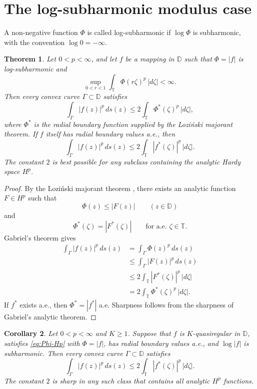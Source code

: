\documentclass[11pt]{article}
\newtheorem{theorem}{Theorem}[section]
\newtheorem{corollary}[theorem]{Corollary}
\theoremstyle{definition}
\theoremstyle{remark}
\newcommand{\D}{\mathbb D}
\newcommand{\T}{\mathbb T}
\newcommand{\ds}{\,ds}
\begin{document}
\section{The log-subharmonic modulus case}

A non-negative function $\Phi$ is called log-subharmonic if $\log\Phi$ is subharmonic, with the convention $\log0=-\infty$.

\begin{theorem}\label{thm:log-subharmonic}
Let $0<p<\infty$, and let $f$ be a mapping in $\D$ such that $\Phi=|f|$ is log-subharmonic and
\begin{equation}\label{eq:Phi-Hp}
   \sup_{0<r<1}\int_\T \Phi(r\zeta)^p\,|d\zeta|<\infty.
\end{equation}
Then every convex curve $\Gamma\subset\D$ satisfies
\begin{equation}\label{eq:log-sub-gabriel}
   \int_\Gamma |f(z)|^p\ds(z)
   \le 2\int_\T \Phi^*(\zeta)^p\,|d\zeta|,
\end{equation}
where $\Phi^*$ is the radial boundary function supplied by the Lozi\'nski majorant theorem. If $f$ itself has radial boundary values a.e., then
\begin{equation}\label{eq:log-sub-gabriel-boundary}
   \int_\Gamma |f(z)|^p\ds(z)
   \le 2\int_\T |f^*(\zeta)|^p\,|d\zeta|.
\end{equation}
The constant $2$ is best possible for any subclass containing the analytic Hardy space $H^p$.
\end{theorem}

\begin{proof}
By the Lozi\'nski majorant theorem \cite{Lozinski1944}, there exists an analytic function $F\in H^p$ such that
\[
   \Phi(z)\le |F(z)| \qquad (z\in\D)
\]
and
\[
   \Phi^*(\zeta)=|F^*(\zeta)| \qquad \text{for a.e. }\zeta\in\T.
\]
Gabriel's theorem gives
\begin{align*}
   \int_\Gamma |f(z)|^p\ds(z)
   &=\int_\Gamma \Phi(z)^p\ds(z) \\
   &\le \int_\Gamma |F(z)|^p\ds(z) \\
   &\le 2\int_\T |F^*(\zeta)|^p\,|d\zeta| \\
   &=2\int_\T \Phi^*(\zeta)^p\,|d\zeta|.
\end{align*}
If $f^*$ exists a.e., then $\Phi^*=|f^*|$ a.e. Sharpness follows from the sharpness of Gabriel's analytic theorem.
\end{proof}

\begin{corollary}\label{cor:qr-log-sub}
Let $0<p<\infty$ and $K\ge1$. Suppose that $f$ is $K$-quasiregular in $\D$, satisfies \eqref{eq:Phi-Hp} with $\Phi=|f|$, has radial boundary values a.e., and $\log|f|$ is subharmonic. Then every convex curve $\Gamma\subset\D$ satisfies
\[
   \int_\Gamma |f(z)|^p\ds(z)
   \le 2\int_\T |f^*(\zeta)|^p\,|d\zeta|.
\]
The constant $2$ is sharp in any such class that contains all analytic $H^p$ functions.
\end{corollary}
\end{document}
